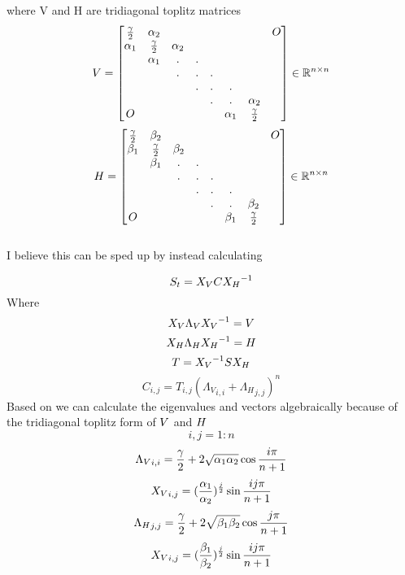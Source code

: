 \documentclass{article}
\begin{document}
where V and H are tridiagonal toplitz matrices 
\[ V = 
\begin{bmatrix}
	\frac{\gamma}{2} & \alpha_{2} & & & & & & O \\ 
	\alpha_{1} & \frac{\gamma}{2} & \alpha_{2} & & & & & \\
	& \alpha_{1} & . & . & & & & \\
	& &  . & . & . & & &  \\
	& & & . & . & . & & \\
	& & & & . & .& \alpha_{2} \\
	O & & & & &  \alpha_{1} & \frac{\gamma}{2}
\end{bmatrix} \in \mathbb{R}^{n\times n} \]
\[H = 
\begin{bmatrix}
	\frac{\gamma}{2} & \beta_{2} & & & & & & O \\ 
	\beta_{1} & \frac{\gamma}{2} & \beta_{2} & & & & & \\
	& \beta_{1} & . & . & & & & \\
	& &  . & . & . & & &  \\
	& & & . & . & . & & \\
	& & & & . & .& \beta_{2} \\
	O & & & & &  \beta_{1} & \frac{\gamma}{2}
\end{bmatrix} \in \mathbb{R}^{n\times n}\] \\ 
I believe this can be sped up by instead calculating
\newcommand{\innerSum}{C}
\newcommand{\verticalBasis}{{X_V}}
\newcommand{\verticalEigens}{{\Lambda_V}}
\newcommand{\horizontalBasis}{{X_H}}
\newcommand{\horizontalEigens}{{\Lambda_H}}
\newcommand{\transformedSourceGrid}{T}

\[ \sourceGrid_t = \verticalBasis \innerSum \horizontalBasis^{-1} \] 
Where
\[\verticalBasis \verticalEigens \verticalBasis^{-1} = \verticalBands \]
\[\horizontalBasis \horizontalEigens \horizontalBasis^{-1} = \horizontalBands\]
\[\transformedSourceGrid = \verticalBasis^{-1} \sourceGrid \horizontalBasis\]
\[\innerSum_{i,j} = \transformedSourceGrid_{i,j} (\verticalEigens_{i,i} + \horizontalEigens_{j,j})^n\]
Based on \cite{noschese2013tridiagonal} we can calculate the eigenvalues and vectors 
algebraically because of the tridiagonal toplitz form of $V$ and $H$ 
\[ i,j = 1:n\]
\[ \verticalEigens_{i,i} = \frac{\stencilMiddle}{2} + 2\sqrt{\stencilTop \stencilBottom}\cos{\frac{i\pi}{n+1}}\]
\[ \verticalBasis_{i,j} = (\frac{\stencilTop}{\stencilBottom})^{\frac{j}{2}}\sin{\frac{ij\pi}{n+1}} \]
\[ \horizontalEigens_{j,j} = \frac{\stencilMiddle}{2} + 2\sqrt{\stencilLeft \stencilRight}\cos{\frac{j\pi}{n+1}} \]
\[ \verticalBasis_{i,j} = (\frac{\stencilLeft}{\stencilRight})^{\frac{j}{2}}\sin{\frac{ij\pi}{n+1}} \]
\end{document}

